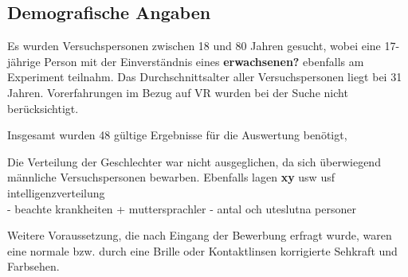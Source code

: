 \documentclass{Bericht}
\begin{document}
\subsection{Demografische Angaben}
Es wurden Versuchspersonen zwischen 18 und 80 Jahren gesucht, wobei eine 17-jährige Person mit der Einverständnis eines \textbf{erwachsenen?} ebenfalls am Experiment teilnahm. Das Durchschnittsalter aller Versuchspersonen liegt bei 31 Jahren. Vorerfahrungen im Bezug auf VR wurden bei der Suche nicht berücksichtigt.

Insgesamt wurden 48 gültige Ergebnisse für die Auswertung benötigt, 


Die Verteilung der Geschlechter war nicht ausgeglichen, da sich überwiegend männliche Versuchspersonen bewarben. Ebenfalls lagen \textbf{xy} usw usf intelligenzverteilung \\


- beachte krankheiten + muttersprachler
- antal och uteslutna personer 


Weitere Voraussetzung, die nach Eingang der Bewerbung erfragt wurde, waren eine normale bzw. durch eine Brille oder Kontaktlinsen korrigierte Sehkraft und Farbsehen. 
\end{document}
